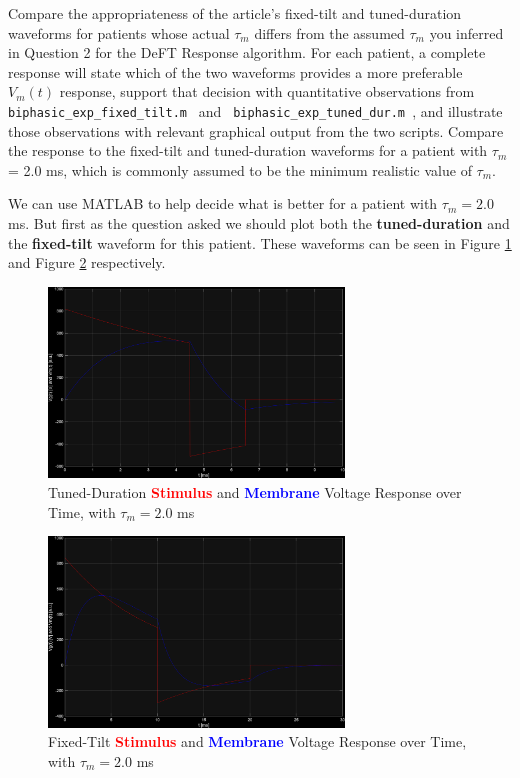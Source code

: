 \documentclass[]{report}
\begin{document}
Compare the appropriateness of the article’s fixed-tilt and tuned-duration waveforms for patients 
whose actual $\tau_m$ differs from the assumed  $\tau_m$ you inferred in Question 2 for the DeFT Response 
algorithm. For each patient, a complete response will state which of the two waveforms provides 
a more preferable $V_m(t)$ response, support that decision with quantitative observations from 
\texttt{ biphasic\_exp\_fixed\_tilt.m } and \texttt{ biphasic\_exp\_tuned\_dur.m }, and illustrate those 
observations with relevant graphical output from the two scripts. Compare the response to the fixed-tilt and tuned-duration waveforms for a patient with $\tau_m$ = 2.0 ms, which is commonly assumed to be the minimum realistic value of  $\tau_m$. 

We can use MATLAB to help decide what is better for a patient with  $\tau_m = 2.0$ ms. But first as the question asked we should plot both the \textbf{tuned-duration} and the \textbf{fixed-tilt} waveform for this patient. These waveforms can be seen in Figure \ref{fig:3} and Figure \ref{fig:4} respectively.

\begin{figure}[H]
	\centering
	\includegraphics[width=0.7\textwidth]{tau2ms_tuned_dur.png}
	\caption{\centering Tuned-Duration \textcolor{red}{\textbf{Stimulus}} and \textcolor{blue}{\textbf{Membrane}} Voltage Response over Time, with $\tau_m = 2.0$ ms}
	\label{fig:3}
\end{figure}

\begin{figure}[H]
	\centering
	\includegraphics[width=0.7\textwidth]{tau2ms_fixed_tilt.png}
	\caption{\centering Fixed-Tilt \textcolor{red}{\textbf{Stimulus}} and \textcolor{blue}{\textbf{Membrane}} Voltage Response over Time, with $\tau_m = 2.0$ ms}
	\label{fig:4}
\end{figure}
\end{document}
